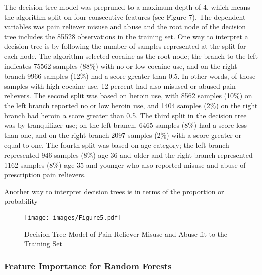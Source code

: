 \documentclass[sigconf]{acmart}
\begin{document}
The decision tree model was prepruned to a maximum 
depth of 4, which means the algorithm split on four consecutive features 
(see Figure 7). The dependent variables was pain reliever misuse and abuse 
and the root node of the decision tree includes the 85528 observations in 
the training set. One way to interpret a decision tree is by following the 
number of samples represented at the split for each node. The algorithm 
selected cocaine as the root node; the branch to the left indicates 75562 
samples (88\%) with no or low cocaine use, and on the right branch 9966 samples 
(12\%) had a score greater than 0.5. In other words, of those samples with 
high cocaine use, 12 percent had also misused or abused pain relievers. 
The second split was based on heroin use, with 8562 samples (10\%) on the 
left branch reported no or low heroin use, and 1404 samples (2\%) on the right 
branch had heroin a score greater than 0.5. The third split in the decision 
tree was by tranquilizer use; on the left branch, 6465 samples (8\%) had a 
score less than one, and on the right branch 2097 samples (2\%) with a score 
greater or equal to one. The fourth split was based on age category; the left 
branch represented 946 samples (8\%) age 36 and older and the right branch 
represented 1162 samples (8\%) age 35 and younger who also reported misuse 
and abuse of prescription pain relievers. 

Another way to interpret decision trees is in terms of the proportion or
probability



\begin{figure}[!ht]
  \centering\texttt{[image: images/Figure5.pdf]}
  \caption{Decision Tree Model of Pain Reliever Misuse and Abuse
  fit to the Training Set}
  \label{f:Figure5}
\end{figure}

\subsubsection{Feature Importance for Random Forests}
\end{document}
